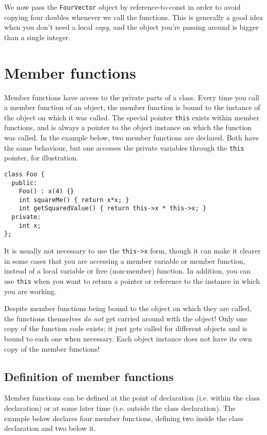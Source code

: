 \documentclass[a4paper]{scrartcl}
\begin{document}
We now pass the \verb|FourVector| object by reference-to-const in order to avoid copying four doubles whenever we call the functions. This is generally a good idea when you don't need a local \emph{copy}, and the object you're passing around is bigger than a single integer.

\section{Member functions}
Member functions have access to the private parts of a class. Every time you call a member function of an object, the member function is bound to the instance of the object on which it was called. The special pointer \verb|this| exists within member functions, and is always a pointer to the object instance on which the function was called. In the example below, two member functions are declared. Both have the same behaviour, but one accesses the private variables through the \verb|this| pointer, for illustration.

\begin{verbatim}
class Foo {
  public:
    Foo() : x(4) {}
    int squareMe() { return x*x; }
    int getSquaredValue() { return this->x * this->x; }
  private:
    int x;
};
\end{verbatim}

It is usually not necessary to use the \verb|this->x| form, though it can make it clearer in some cases that you are accessing a member variable or member function, instead of a local variable or free (non-member) function. In addition, you can use \verb|this| when you want to return a pointer or reference to the instance in which you are working.

Despite member functions being bound to the object on which they are called, the functions themselves \emph{do not} get carried around with the object! Only one copy of the function code exists; it just gets called for different objects and is bound to each one when necessary. Each object instance does not have its own copy of the member functions!

\subsection{Definition of member functions}
Member functions can be defined at the point of declaration (i.e. within the class declaration) or at some later time (i.e. outside the class declaration). The example below declares four member functions, defining two inside the class declaration and two below it.
\end{document}
